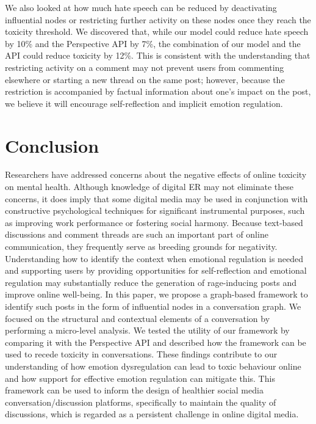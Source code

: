 \documentclass[acmtog]{acmart}
\begin{document}
We also looked at how much hate speech can be reduced by deactivating influential nodes or restricting further activity on these nodes once they reach the toxicity threshold. We discovered that, while our model could reduce hate speech by 10\% and the Perspective API by 7\%, the combination of our model and the API could reduce toxicity by 12\%. This is consistent with the understanding that restricting activity on a comment may not prevent users from commenting elsewhere or starting a new thread on the same post; however, because the restriction is accompanied by factual information about one's impact on the post, we believe it will encourage self-reflection and implicit emotion regulation.












\section{Conclusion}
Researchers have addressed concerns about the negative effects of online toxicity on mental health. Although knowledge of digital ER may not eliminate these concerns, it does imply that some digital media may be used in conjunction with constructive psychological techniques for significant instrumental purposes, such as improving work performance or fostering social harmony. Because text-based discussions and comment threads are such an important part of online communication, they frequently serve as breeding grounds for negativity. Understanding how to identify the context when emotional regulation is needed and supporting users by providing opportunities for self-reflection and emotional regulation may substantially reduce the generation of rage-inducing posts and improve online well-being.
In this paper, we propose a graph-based framework to identify such posts in the form of influential nodes in a conversation graph. We focused on the structural and contextual elements of a conversation by performing a micro-level analysis. We tested the utility of our framework by comparing it with the Perspective API and described how the framework can be used to recede toxicity in conversations. These findings contribute to our understanding of how emotion dysregulation can lead to toxic behaviour online and how support for effective emotion regulation can mitigate this. This framework can be used to inform the design of healthier social media conversation/discussion platforms, specifically to maintain the quality of discussions, which is regarded as a persistent challenge in online digital media.
\end{document}
